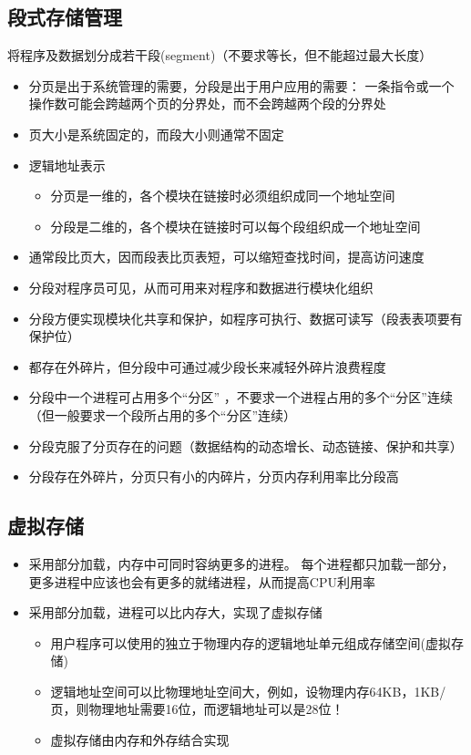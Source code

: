 \subsection{段式存储管理}
将程序及数据划分成若干段(segment)（不要求等长，但不能超过最大长度）
\begin{itemize}
    \item 分页是出于系统管理的需要，分段是出于用户应用的需要：
    一条指令或一个操作数可能会跨越两个页的分界处，而不会跨越两个段的分界处
    \item 页大小是系统固定的，而段大小则通常不固定
    \item 逻辑地址表示
    \begin{itemize}
    \item 分页是一维的，各个模块在链接时必须组织成同一个地址空间
    \item 分段是二维的，各个模块在链接时可以每个段组织成一个地址空间
    \end{itemize}
    \item 通常段比页大，因而段表比页表短，可以缩短查找时间，提高访问速度
    \item 分段对程序员可见，从而可用来对程序和数据进行模块化组织
    \item 分段方便实现模块化共享和保护，如程序可执行、数据可读写（段表表项要有保护位）
    \item 都存在外碎片，但分段中可通过减少段长来减轻外碎片浪费程度
    \item 分段中一个进程可占用多个“分区” ，不要求一个进程占用的多个“分区”连续（但一般要求一个段所占用的多个“分区”连续）
    \item 分段克服了分页存在的问题（数据结构的动态增长、动态链接、保护和共享）
    \item 分段存在外碎片，分页只有小的内碎片，分页内存利用率比分段高
\end{itemize}

\subsection{虚拟存储}
\begin{itemize}
    \item 采用部分加载，内存中可同时容纳更多的进程。
每个进程都只加载一部分，更多进程中应该也会有更多的就绪进程，从而提高CPU利用率
    \item 采用部分加载，进程可以比内存大，实现了虚拟存储
    \begin{itemize}
\item 用户程序可以使用的独立于物理内存的逻辑地址单元组成存储空间(虚拟存储)
\item 逻辑地址空间可以比物理地址空间大，例如，设物理内存64KB，1KB/页，则物理地址需要16位，而逻辑地址可以是28位！
\item 虚拟存储由内存和外存结合实现
    \end{itemize}
\end{itemize}

